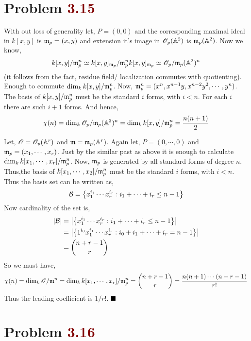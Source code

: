 \documentclass[12pt]{article}
\begin{document}
\section{Problem \textcolor{maroon}{3.15}} %

 With out loss of generality let, $P=(0,0)$ and the corresponding maximal ideal in $k[x,y]$ is $\mathfrak{m}_p =(x,y)$ and extension it's image in $\mathscr{O}_p(\mathbb{A}^2)$ is $\mathfrak{m}_p(\mathbb{A}^2)$. Now we know, $$k[x,y]/\mathfrak{m}_p^n \simeq k[x,y]_{\mathfrak{m}_p}/ \mathfrak{m}_p^n k[x,y]_{\mathfrak{m}_p} \simeq \mathscr{O}_p/\mathfrak{m}_p(\mathbb{A}^2)^n$$ (it follows from the fact, residue field/ localization commutes with quotienting). Enough to commute $\dim_k k[x,y]/\mathfrak{m}_p^n$. Now, $\mathfrak{m}_p^n = (x^n,x^{n-1}y,x^{n-2}y^2,\cdots,y^n)$. The basis of $k[x,y]/\mathfrak{m}_p^n$ must be the standard $i$ forms, with $i<n$. For each $i$ there are such $i+1$ forms. And hence, $$\chi(n) = \dim_k \mathscr{O}_p/\mathfrak{m}_p(\mathbb{A}^2)^n = \dim_k k[x,y]/\mathfrak{m}_p^n = \frac{n(n+1)}{2}$$

\vspace*{0.2cm}


\noindent {} Let, $\mathscr{O} = \mathscr{O}_p(\mathbb{A}^r)$ and $\mathfrak{m} = \mathfrak{m}_p(\mathbb{A}^r)$. Again let, $P=(0,\cdots,0)$ and $\mathfrak{m}_p =(x_1,\cdots,x_r)$. Just by the similar past as above it is enough to calculate $\dim_k k[x_1,\cdots,x_r]/\mathfrak{m}_p^n$. Now, $\mathfrak{m}_p$ is generated by all standard forms of degree $n$. Thus,the basis of $k[x_1,\cdots,x_2]/\mathfrak{m}_p^n$ must be the standard $i$ forms, with $i<n$. Thus the basis set can be written as, 
$$\mathcal{B} = \qty{x_1^{i_1}\cdots x_r^{i_r}:i_1+\cdots +i_r \leq n-1}$$ Now cardinality of the set is, \begin{align*}
    \abs{\mathcal{B}} &= \abs{\qty{x_1^{i_1}\cdots x_r^{i_r}:i_1+\cdots +i_r \leq n-1}} \\
    &= \abs{\qty{1^{i_0}x_1^{i_1}\cdots x_r^{i_r}:i_0+i_1+\cdots +i_r =n-1}} \\
    &= \binom{n+r-1}{r}
\end{align*}
So we must have,  $$\chi(n) = \dim_k \mathscr{O}/\mathfrak{m}^n= \dim_k k[x_1,\cdots,x_r]/\mathfrak{m}_p^n = \binom{n+r-1}{r}= \frac{n(n+1)\cdots (n+r-1)}{r!}$$ Thus the leading coefficient is $1/r!$. $\hfill \blacksquare$

\section{Problem \textcolor{maroon}{3.16}} %
\end{document}
